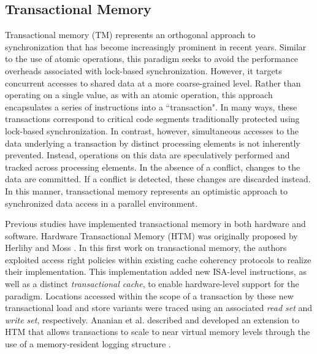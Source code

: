 \subsection{Transactional Memory}
\label{subsec:trans_mem}

Transactional memory (TM) represents an orthogonal approach to synchronization that has become increasingly prominent in recent years.
Similar to the use of atomic operations, this paradigm seeks to avoid the performance overheads associated with lock-based synchronization.
However, it targets concurrent accesses to shared data at a more coarse-grained level. 
Rather than operating on a single value, as with an atomic operation, this approach encapsulates a series of instructions into a ``transaction".
In many ways, these transactions correspond to critical code segments traditionally protected using lock-based synchronization.
In contrast, however, simultaneous accesses to the data underlying a transaction by distinct processing elements is not inherently prevented.
Instead, operations on this data are speculatively performed and tracked across processing elements.
In the absence of a conflict, changes to the data are committed.
If a conflict is detected, these changes are discarded instead.
In this manner, transactional memory represents an optimistic approach to synchronized data access in a parallel environment.

Previous studies have implemented transactional memory in both hardware and software.
Hardware Transactional Memory (HTM) was originally proposed by Herlihy and Moss \cite{herlihy1993lockfree}.
In this first work on transactional memory, the authors exploited access right policies within existing cache coherency protocols to realize their implementation.
This implementation added new ISA-level instructions, as well as a distinct \textit{transactional cache}, to enable hardware-level support for the paradigm.
Locations accessed within the scope of a transaction by these new transactional load and store variants were traced using an associated \textit{read set} and \textit{write set}, respectively.
Ananian et al. described and developed an extension to HTM that allows transactions to scale to near virtual memory levels through the use of a memory-resident logging structure \cite{ananian2006unbounded}.

